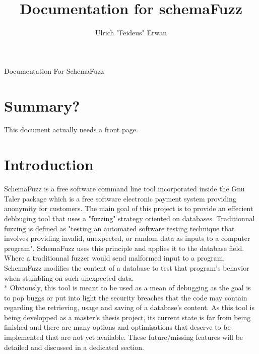 \documentclass{article}
\title{Documentation for schemaFuzz}
\author{Ulrich "Feideus" Erwan}
\begin{document}
\begin{empfile}
	
\maketitle Documentation For SchemaFuzz
	\section{Summary?}
		This document actually needs a front page.
	\section{Introduction}
	
SchemaFuzz is a free software command line tool incorporated inside the Gnu Taler package 
which is a free software electronic payment system providing anonymity for customers.
The main goal of this project is to provide an effecient debbuging tool that uses a "fuzzing" strategy oriented on databases.  
Traditionnal fuzzing is defined as "testing an automated software testing technique that involves providing invalid, unexpected, or random data as inputs to a computer program". SchemaFuzz uses this principle and applies it to the database field.
Where a traditionnal fuzzer would send malformed input to a program, SchemaFuzz modifies the content of a database to test that program's behavior when stumbling on such unexpected data. \\*
Obviously, this tool is meant to be used as a mean of debugging as the goal is to pop buggs or put into light the security breaches that the code may contain regarding the retrieving, usage and saving of a database's content.
As this tool is being developped as a master's thesis project, its current state is far from being finished and there are many options and optimisations that deserve to be implemented that are not yet available.
These future/missing features will be detailed and discussed in a dedicated section.

	

\end{empfile}
\end{document}

